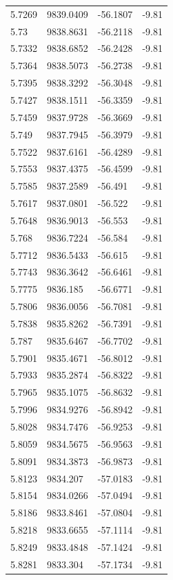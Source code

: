 \begin{table}[H]
\begin{tabular}{llll}
5.7269 & 9839.0409 & -56.1807 & -9.81 \\
5.73 & 9838.8631 & -56.2118 & -9.81 \\
5.7332 & 9838.6852 & -56.2428 & -9.81 \\
5.7364 & 9838.5073 & -56.2738 & -9.81 \\
5.7395 & 9838.3292 & -56.3048 & -9.81 \\
5.7427 & 9838.1511 & -56.3359 & -9.81 \\
5.7459 & 9837.9728 & -56.3669 & -9.81 \\
5.749 & 9837.7945 & -56.3979 & -9.81 \\
5.7522 & 9837.6161 & -56.4289 & -9.81 \\
5.7553 & 9837.4375 & -56.4599 & -9.81 \\
5.7585 & 9837.2589 & -56.491 & -9.81 \\
5.7617 & 9837.0801 & -56.522 & -9.81 \\
5.7648 & 9836.9013 & -56.553 & -9.81 \\
5.768 & 9836.7224 & -56.584 & -9.81 \\
5.7712 & 9836.5433 & -56.615 & -9.81 \\
5.7743 & 9836.3642 & -56.6461 & -9.81 \\
5.7775 & 9836.185 & -56.6771 & -9.81 \\
5.7806 & 9836.0056 & -56.7081 & -9.81 \\
5.7838 & 9835.8262 & -56.7391 & -9.81 \\
5.787 & 9835.6467 & -56.7702 & -9.81 \\
5.7901 & 9835.4671 & -56.8012 & -9.81 \\
5.7933 & 9835.2874 & -56.8322 & -9.81 \\
5.7965 & 9835.1075 & -56.8632 & -9.81 \\
5.7996 & 9834.9276 & -56.8942 & -9.81 \\
5.8028 & 9834.7476 & -56.9253 & -9.81 \\
5.8059 & 9834.5675 & -56.9563 & -9.81 \\
5.8091 & 9834.3873 & -56.9873 & -9.81 \\
5.8123 & 9834.207 & -57.0183 & -9.81 \\
5.8154 & 9834.0266 & -57.0494 & -9.81 \\
5.8186 & 9833.8461 & -57.0804 & -9.81 \\
5.8218 & 9833.6655 & -57.1114 & -9.81 \\
5.8249 & 9833.4848 & -57.1424 & -9.81 \\
5.8281 & 9833.304 & -57.1734 & -9.81 \\

\end{tabular}
\end{table}
